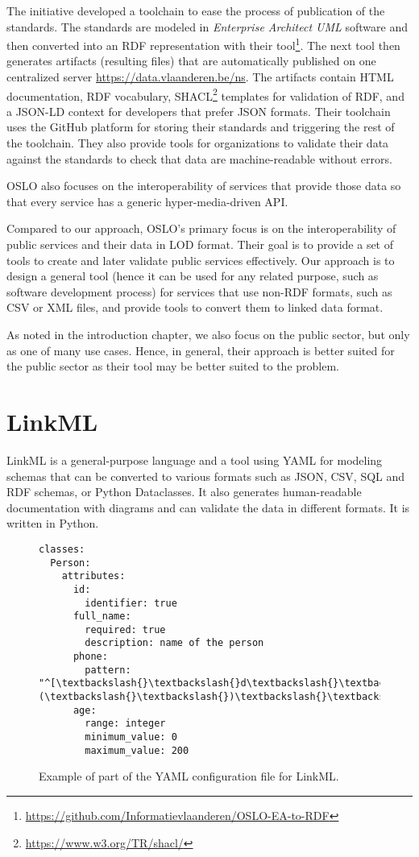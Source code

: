 The initiative developed a toolchain to ease the process of publication of the standards. The standards are modeled in \textit{Enterprise Architect UML} software and then converted into an RDF representation with their tool\footnote{\url{https://github.com/Informatievlaanderen/OSLO-EA-to-RDF}}. The next tool then generates artifacts (resulting files) that are automatically published on one centralized server \url{https://data.vlaanderen.be/ns}. The artifacts contain HTML documentation, RDF vocabulary, SHACL\footnote{\url{https://www.w3.org/TR/shacl/}} templates for validation of RDF, and a JSON-LD context for developers that prefer JSON formats. Their toolchain uses the GitHub platform for storing their standards and triggering the rest of the toolchain. They also provide tools for organizations to validate their data against the standards to check that data are machine-readable without errors.

OSLO also focuses on the interoperability of services that provide those data so that every service has a generic hyper-media-driven API.

\medskip

Compared to our approach, OSLO's primary focus is on the interoperability of public services and their data in LOD format. Their goal is to provide a set of tools to create and later validate public services effectively. Our approach is to design a general tool (hence it can be used for any related purpose, such as software development process) for services that use non-RDF formats, such as CSV or XML files, and provide tools to convert them to linked data format.

As noted in the introduction chapter, we also focus on the public sector, but only as one of many use cases. Hence, in general, their approach is better suited for the public sector as their tool may be better suited to the problem.

\section{LinkML}

LinkML is a general-purpose language and a tool using YAML for modeling schemas that can be converted to various formats such as JSON, CSV, SQL and RDF schemas, or Python Dataclasses. It also generates human-readable documentation with diagrams and can validate the data in different formats. It is written in Python.

\begin{figure}[h!]\centering
    \begin{Verbatim}[commandchars=\\\{\}]
classes:
  Person:
    attributes:
      id:
        identifier: true
      full_name:
        required: true
        description: name of the person
      phone:
        pattern: "^[\textbackslash{}\textbackslash{}d\textbackslash{}\textbackslash{}(\textbackslash{}\textbackslash{})\textbackslash{}\textbackslash{}-]+$"
      age:
        range: integer
        minimum_value: 0
        maximum_value: 200
    \end{Verbatim}
    \caption{Example of part of the YAML configuration file for LinkML.}
\end{figure}


